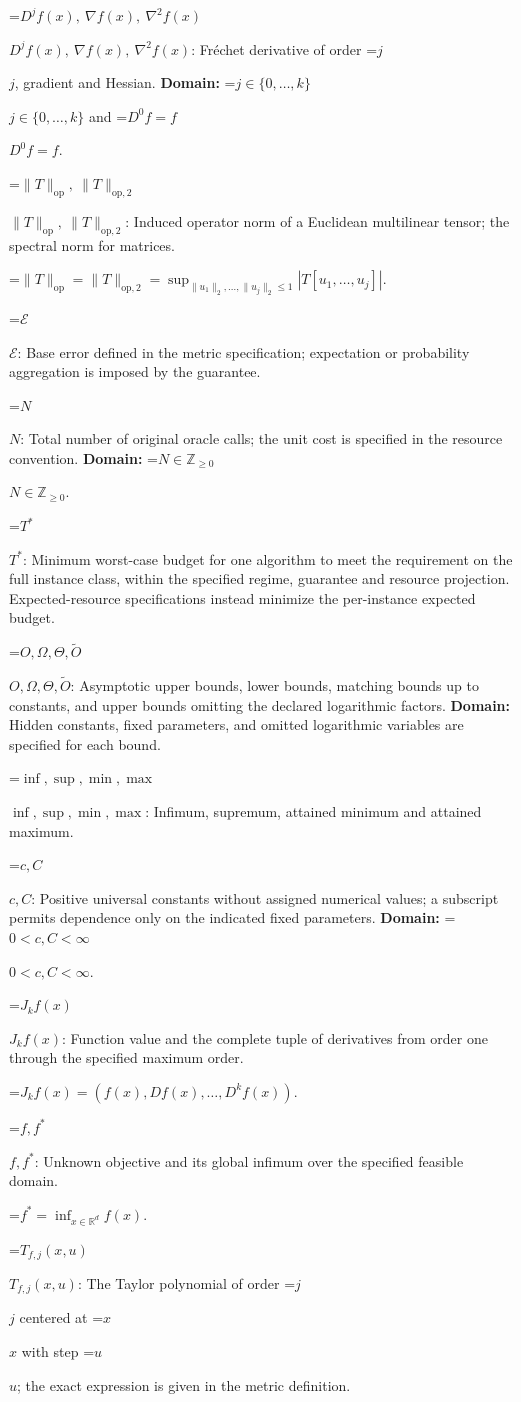 \documentclass[10pt,a4paper]{article}
\newcommand{\AtlasMath}[1]{\par\begingroup\centering\setbox0=\hbox{$\displaystyle #1$}\ifdim\wd0>1.4\linewidth\typeout{ATLAS WIDE FORMULA: \the\wd0}\fi\ifdim\wd0>\linewidth\resizebox{\linewidth}{!}{\box0}\else\box0\fi\par\endgroup}
\newcommand{\AtlasInlineMath}[1]{\begingroup\setbox0=\hbox{$#1$}\ifdim\wd0>.4\linewidth\endgroup\AtlasMath{#1}\else\endgroup$#1$\fi}
\begin{document}
\AtlasInlineMath{D^jf(x),\ \nabla f(x),\ \nabla^2f(x)}: Fréchet derivative of order \AtlasInlineMath{j}, gradient and Hessian. \textbf{Domain:} \AtlasInlineMath{j\in\{0,\ldots,k\}} and \AtlasInlineMath{D^0f=f}.

\AtlasInlineMath{\|T\|_{\mathrm{op}},\ \|T\|_{\mathrm{op},2}}: Induced operator norm of a Euclidean multilinear tensor; the spectral norm for matrices.


\AtlasMath{\|T\|_{\mathrm{op}}=\|T\|_{\mathrm{op},2}=\sup_{\|u_1\|_2,\ldots,\|u_j\|_2\le1}|T[u_1,\ldots,u_j]|.}


\AtlasInlineMath{\mathcal{E}}: Base error defined in the metric specification; expectation or probability aggregation is imposed by the guarantee.

\AtlasInlineMath{N}: Total number of original oracle calls; the unit cost is specified in the resource convention. \textbf{Domain:} \AtlasInlineMath{N\in\mathbb{Z}_{\ge0}}.

\AtlasInlineMath{T^*}: Minimum worst-case budget for one algorithm to meet the requirement on the full instance class, within the specified regime, guarantee and resource projection. Expected-resource specifications instead minimize the per-instance expected budget.

\AtlasInlineMath{O,\Omega,\Theta,\widetilde{O}}: Asymptotic upper bounds, lower bounds, matching bounds up to constants, and upper bounds omitting the declared logarithmic factors. \textbf{Domain:} Hidden constants, fixed parameters, and omitted logarithmic variables are specified for each bound.

\AtlasInlineMath{\inf,\sup,\min,\max}: Infimum, supremum, attained minimum and attained maximum.

\AtlasInlineMath{c,C}: Positive universal constants without assigned numerical values; a subscript permits dependence only on the indicated fixed parameters. \textbf{Domain:} \AtlasInlineMath{0<c,C<\infty}.

\AtlasInlineMath{J_{k}f(x)}: Function value and the complete tuple of derivatives from order one through the specified maximum order.


\AtlasMath{J_{k}f(x)=(f(x),Df(x),\ldots,D^{k}f(x)).}


\AtlasInlineMath{f,f^*}: Unknown objective and its global infimum over the specified feasible domain.


\AtlasMath{f^*=\inf_{x\in \mathbb{R}^d}f(x).}


\AtlasInlineMath{T_{f,j}(x,u)}: The Taylor polynomial of order \AtlasInlineMath{j} centered at \AtlasInlineMath{x} with step \AtlasInlineMath{u}; the exact expression is given in the metric definition.
\end{document}
